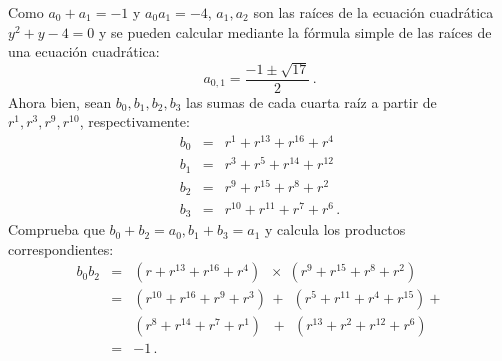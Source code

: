 Como $a_0+a_1=-1$ y $a_0 a_1=-4$, $a_1,a_2$ son las raíces de la ecuación cuadrática $y^2+y-4=0$ y se pueden calcular mediante la fórmula simple de las raíces de una ecuación cuadrática:
\[
a_{0,1} = \frac{-1\pm\sqrt{17}}{2}\,.
\]
Ahora bien, sean $b_0,b_1,b_2,b_3$ las sumas de cada cuarta raíz a partir de $r^1,r^3,r^9,r^{10}$, respectivamente:
\begin{eqnarray*}
b_0&=& r^1+ r^{13} + r^{16} + r^4\\
b_1&=& r^3+ r^{5} + r^{14} + r^{12}\\
b_2&=& r^9+ r^{15} + r^{8} + r^2\\
b_3&=& r^{10}+ r^{11} + r^{7} + r^6\,.
\end{eqnarray*}
Comprueba que $b_0+b_2=a_0, b_1+b_3=a_1$ y calcula los productos correspondientes:
\begin{eqnarray*}
b_0b_2&=&(r + r^{13} + r^{16} +r^4)\;\;\times\;(r^9 + r^{15} + r^{8} +r^{2})\\
&=&(r^{10}+r^{16}+r^9+r^3)\,+\;\,(r^{5}+r^{11}+r^4+r^{15})+\\
&&(r^{8}+r^{14}+r^7+r^1)\,\;\,+\;\,(r^{13}+r^{2}+r^{12}+r^6)\\
&=&-1\,.
\end{eqnarray*}

